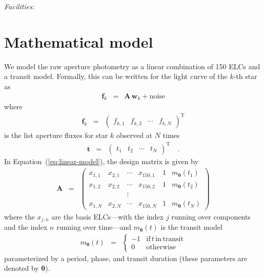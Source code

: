 \documentclass[12pt,preprint]{aastex}
\newcommand{\Eq}[1]{Equation~(\ref{eq:#1})}
\newcommand{\eq}[1]{\Eq{#1}}
\newcommand{\eqlabel}[1]{\label{eq:#1}}
\newcommand{\sectlabel}[1]{\label{sect:#1}}
\newcommand{\T}{\ensuremath{\mathrm{T}}}
\newcommand{\bvec}[1]{{\ensuremath{\boldsymbol{#1}}}}
\begin{document}
{\it Facilities:} 

\appendix

\section{Mathematical model}
\sectlabel{math}

We model the raw aperture photometry as a linear combination of 150 ELCs and
a transit model.
Formally, this can be written for the light curve of the $k$-th star as
\begin{eqnarray}\eqlabel{linear-model}
\bvec{f}_k &=& \bvec{A}\,\bvec{w}_k + \mathrm{noise}
\end{eqnarray}
where
\begin{eqnarray}
\bvec{f}_k &=& \left (\begin{array}{cccc}
    f_{k,1} & f_{k,2} & \cdots & f_{k,N}
\end{array}\right )^\T
\end{eqnarray}
is the list aperture fluxes for star $k$ observed at $N$ times
\begin{eqnarray}
\bvec{t} &=& \left (\begin{array}{cccc}
    t_{1} & t_{2} & \cdots & t_{N}
\end{array}\right )^\T \quad.
\end{eqnarray}
In \eq{linear-model}, the design matrix is given by
\begin{eqnarray}
\bvec{A} &=& \left (\begin{array}{cccccc}
    x_{1,1} & x_{2,1} & \cdots & x_{150,1} & 1 & m_\bvec{\theta}(t_1) \\
    x_{1,2} & x_{2,2} & \cdots & x_{150,2} & 1 & m_\bvec{\theta}(t_2) \\
    && \vdots &&&\\
    x_{1,N} & x_{2,N} & \cdots & x_{150,N} & 1 & m_\bvec{\theta}(t_N)
\end{array}\right )
\end{eqnarray}
where the $x_{j,n}$ are the basis ELCs---with the index $j$ running over
components and the index $n$ running over time---and $m_\bvec{\theta}(t)$ is
the transit model
\begin{eqnarray}
m_\bvec{\theta}(t) &=& \left\{\begin{array}{cl}
-1 & \mathrm{if\,}t\,\mathrm{in\,transit} \\
0 & \mathrm{otherwise}
\end{array}\right.
\end{eqnarray}
parameterized by a period, phase, and transit duration (these parameters are
denoted by \bvec{\theta}).
\end{document}
